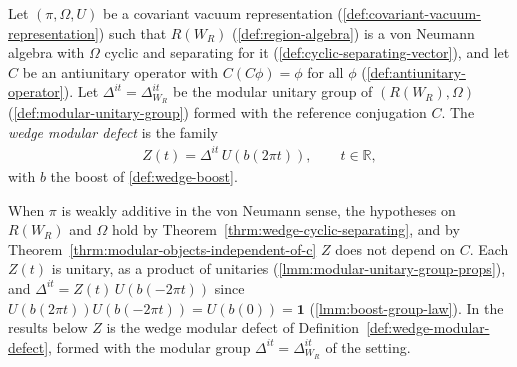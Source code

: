 \begin{definition}
    \label{def:wedge-modular-defect}
    \leanok
    Let $(\pi, \Omega, U)$ be a covariant vacuum representation (\ref{def:covariant-vacuum-representation}) such that $R(W_R)$ (\ref{def:region-algebra}) is a von Neumann algebra with $\Omega$ cyclic and separating for it (\ref{def:cyclic-separating-vector}), and let $C$ be an antiunitary operator with $C(C\phi) = \phi$ for all $\phi$ (\ref{def:antiunitary-operator}). Let $\Delta^{it} = \Delta_{W_R}^{it}$ be the modular unitary group of $(R(W_R), \Omega)$ (\ref{def:modular-unitary-group}) formed with the reference conjugation $C$. The \emph{wedge modular defect} is the family
    \begin{align}
        Z(t) = \Delta^{it}\,U(b(2\pi t)), \qquad t \in \mathbb{R},
    \end{align}
    with $b$ the boost of \ref{def:wedge-boost}.
\end{definition}

When $\pi$ is weakly additive in the von Neumann sense, the hypotheses on $R(W_R)$ and $\Omega$ hold by Theorem~\ref{thrm:wedge-cyclic-separating}, and by Theorem~\ref{thrm:modular-objects-independent-of-c} $Z$ does not depend on $C$. Each $Z(t)$ is unitary, as a product of unitaries (\ref{lmm:modular-unitary-group-props}), and $\Delta^{it} = Z(t)\,U(b(-2\pi t))$ since $U(b(2\pi t))U(b(-2\pi t)) = U(b(0)) = \mathbf{1}$ (\ref{lmm:boost-group-law}). In the results below $Z$ is the wedge modular defect of Definition~\ref{def:wedge-modular-defect}, formed with the modular group $\Delta^{it} = \Delta_{W_R}^{it}$ of the setting.

